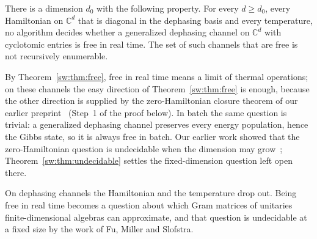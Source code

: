 \begin{theorem}[Undecidability]\label{sw:thm:undecidable}
There is a dimension $d_0$ with the following property. For every $d\ge d_0$, every Hamiltonian on $\mathbb C^d$ that is diagonal in the dephasing basis and every temperature, no algorithm decides whether a generalized dephasing channel on $\mathbb C^d$ with cyclotomic entries is free in real time. The set of such channels that are free is not recursively enumerable.
\end{theorem}

By Theorem~\ref{sw:thm:free}, free in real time means a limit of thermal operations; on these channels the easy direction of Theorem~\ref{sw:thm:free} is enough, because the other direction is supplied by the zero-Hamiltonian closure theorem of our earlier preprint~\cite[Thm.~3.2(a)]{Memory} (Step~1 of the proof below). In batch the same question is trivial: a generalized dephasing channel preserves every energy population, hence the Gibbs state, so it is always free in batch. Our earlier work showed that the zero-Hamiltonian question is undecidable when the dimension may grow~\cite{Flagship}; Theorem~\ref{sw:thm:undecidable} settles the fixed-dimension question left open there.

On dephasing channels the Hamiltonian and the temperature drop out. Being free in real time becomes a question about which Gram matrices of unitaries finite-dimensional algebras can approximate, and that question is undecidable at a fixed size by the work of Fu, Miller and Slofstra.

